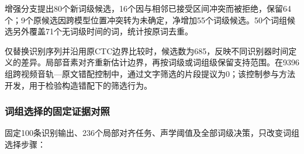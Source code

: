 增强分支提出80个新词级候选，16个因与相邻已接受区间冲突而被拒绝，保留64个；9个原候选因跨模型位置冲突转为未确定，净增加55个词级候选。50个词组候选另外覆盖71个无词级时间的词，统计按原词去重。

仅替换识别序列并沿用原CTC边界比较时，候选数为685，反映不同识别器时间定义的差异。局部音素对齐重新估计边界，再按词级或词组级保留支持范围。在9396组跨视频音轨---原文错配控制中，通过文字筛选的片段提议为0；该控制参与方法开发，用于检验构造错配下的筛选行为。

\hypertarget{q1-ux8bcdux7ec4ux9009ux62e9ux7684ux56faux5b9aux8bc1ux636eux5bf9ux7167}{%
\subsubsection{词组选择的固定证据对照}\label{q1-ux8bcdux7ec4ux9009ux62e9ux7684ux56faux5b9aux8bc1ux636eux5bf9ux7167}}

固定100条识别输出、236个局部对齐任务、声学阈值及全部词级决策，只改变词组选择步骤：

